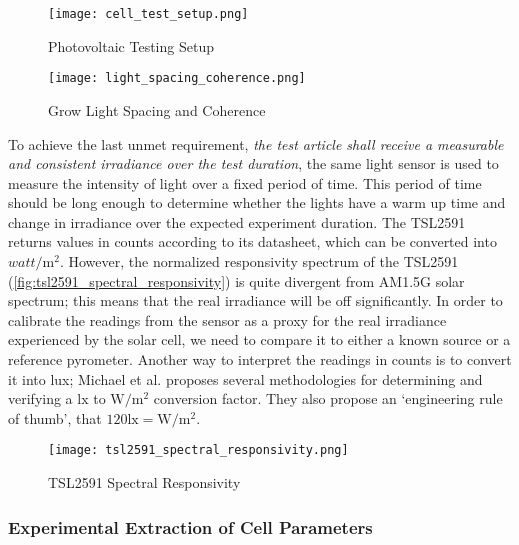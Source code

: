\begin{figure}[!htbp]
    \texttt{[image: cell\_test\_setup.png]}
    \caption{Photovoltaic Testing Setup}
    \label{fig:cell_test_setup}
\end{figure}

\begin{figure}[h]
    \centering
    \texttt{[image: light\_spacing\_coherence.png]}
    \caption{Grow Light Spacing and Coherence}
    \label{fig:light_spacing_coherence}
\end{figure}

To achieve the last unmet requirement, \textit{the test article shall receive a
measurable and consistent irradiance over the test duration}, the same light
sensor is used to measure the intensity of light over a fixed period of time.
This period of time should be long enough to determine whether the lights have a
warm up time and change in irradiance over the expected experiment duration.
The TSL2591 returns values in counts according to its datasheet, which can be
converted into $\si{watt}/\si{\meter}^2$. However, the normalized responsivity
spectrum of the TSL2591 (\autoref{fig:tsl2591_spectral_responsivity}) is quite
divergent from AM1.5G solar spectrum; this means that the real irradiance will
be off significantly. In order to calibrate the readings from the sensor as a
proxy for the real irradiance experienced by the solar cell, we need to compare
it to either a known source or a reference pyrometer. Another way to interpret
the readings in counts is to convert it into lux; Michael et
al.\cite{michael_et_al} proposes several methodologies for determining and
verifying a $\si{\lux}$ to $\si{\watt}/\si{\meter}^2$ conversion factor. They
also propose an `engineering rule of thumb', that $120 \si{\lux} =
\si{\watt}/\si{\meter}^2$.

\begin{figure}[!htbp]
    \centering
    \texttt{[image: tsl2591\_spectral\_responsivity.png]}
    \caption{TSL2591 Spectral Responsivity}
    \label{fig:tsl2591_spectral_responsivity}
\end{figure}


\subsubsection{Experimental Extraction of Cell Parameters}\label{subsubsec:experimental_extraction_of_cell_parameters}


